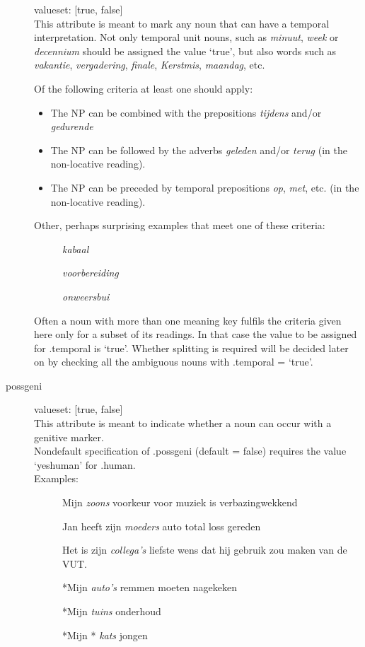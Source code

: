 \begin{description}
valueset: [true, false]\\

This attribute is meant to mark any noun that can have a temporal interpretation.
Not only temporal unit nouns, such as {\em minuut}, {\em week} or 
{\em decennium}
should be assigned the value `true', but also words such as {\em vakantie},
{\em vergadering}, {\em finale}, {\em Kerstmis}, {\em maandag},  etc. 

Of the following criteria at least one should apply:
\begin{itemize}
  \item 
 The NP can be combined with the prepositions {\em tijdens} and/or {\em gedurende}
  \item
 The NP can be followed by the adverbs  {\em geleden} and/or {\em terug} (in
the non-locative reading).
  \item
 The NP can be preceded by temporal prepositions {\em op}, {\em met}, etc. (in
the non-locative reading).
\end{itemize}

Other, perhaps surprising examples that meet one of these criteria:
\begin{description}
  \item[] {\em kabaal}
  \item[] {\em voorbereiding}
  \item[] {\em onweersbui}
\end{description}

Often a noun with more than one meaning key fulfils the criteria given here 
only for a subset of its readings. In that case the value to be assigned 
for .temporal is `true'. Whether splitting is required will be decided later on
by checking all the ambiguous nouns with .temporal = `true'.

\newpage
\item 
[possgeni]\mbox{}

valueset: [true, false]\\

This attribute is meant to indicate whether a noun can occur with 
a genitive marker.\\

Nondefault specification of .possgeni
(default = false) requires the value `yeshuman' for .human.\\

Examples:
\begin{description}
\item []
Mijn {\em zoons} voorkeur voor muziek is verbazingwekkend
\item []
Jan heeft zijn {\em moeders} auto total loss gereden
\item []
Het is zijn {\em collega's} liefste wens dat hij gebruik zou maken van de VUT.
\item []
*Mijn {\em auto's} remmen moeten nagekeken
\item []
*Mijn {\em tuins} onderhoud 
\item []
*Mijn * {\em kats} jongen


\end{description}
\end{description}
